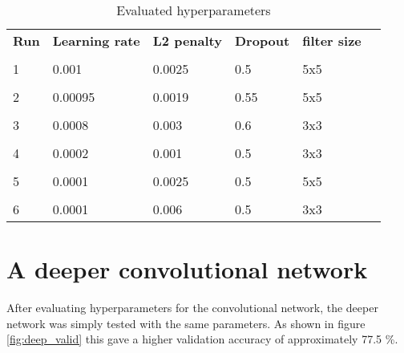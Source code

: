 \begin{table}[htbp]
	\begin{center}
	\begin{tabular}{l  l l l l l }
	\textbf{Run} &  \textbf{Learning rate} & \textbf{L2 penalty} &  	\textbf{Dropout} & \textbf{filter size} & \\
		\\
		1 & 0.001 & 0.0025 & 0.5 & 5x5 \\\hline
		\\
		2 & 0.00095 & 0.0019 & 0.55 & 5x5 \\\hline
		\\
		3 & 0.0008 & 0.003 & 0.6 & 3x3 \\\hline
		\\
		4 & 0.0002 & 0.001 & 0.5 & 3x3 \\\hline
		\\
		5 & 0.0001 & 0.0025 & 0.5 & 5x5 \\\hline
		\\
		6 & 0.0001 & 0.006 & 0.5 & 3x3 \\\hline
	\end{tabular}
	\caption{Evaluated hyperparameters}
	\label{tbl:parameters}
	\end{center}
\end{table}


\section{A deeper convolutional network}
After evaluating hyperparameters for the convolutional network, the deeper network was simply tested with the same parameters. As shown in figure \ref{fig:deep_valid} this gave a higher validation accuracy of approximately 77.5 \%.



